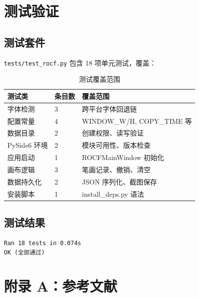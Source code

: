 \documentclass[12pt,a4paper]{ctexart}
\begin{document}
\section{测试验证}

\subsection{测试套件}

\texttt{tests/test\_rocf.py} 包含 18 项单元测试，覆盖：

\begin{table}[h]
\centering
\begin{tabular}{lll}
\toprule
\textbf{测试类} & \textbf{条目数} & \textbf{覆盖范围} \\
\midrule
字体检测   & 3 & 跨平台字体回退链 \\
配置常量   & 4 & WINDOW\_W/H, COPY\_TIME 等 \\
数据目录   & 2 & 创建权限、读写验证 \\
PySide6 环境 & 2 & 模块可用性、版本检查 \\
应用启动   & 1 & ROCFMainWindow 初始化 \\
画布逻辑   & 3 & 笔画记录、撤销、清空 \\
数据持久化 & 2 & JSON 序列化、截图保存 \\
安装脚本   & 1 & install\_deps.py 语法 \\
\bottomrule
\end{tabular}
\caption{测试覆盖范围}
\end{table}

\subsection{测试结果}

\begin{verbatim}
Ran 18 tests in 0.074s
OK (全部通过)
\end{verbatim}

\section*{附录 A：参考文献}
\end{document}
